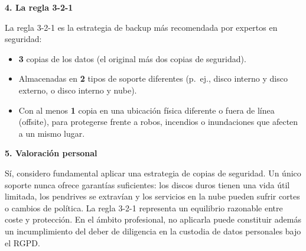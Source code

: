 \begin{solution}
	\medskip

	\textbf{4. La regla 3-2-1}

	La regla 3-2-1 es la estrategia de backup más recomendada por expertos en seguridad:

	\begin{itemize}
		\item \textbf{3} copias de los datos (el original más dos copias de seguridad).
		\item Almacenadas en \textbf{2} tipos de soporte diferentes (p.~ej., disco interno y disco
		      externo, o disco interno y nube).
		\item Con al menos \textbf{1} copia en una ubicación física diferente o fuera de línea
		      (offsite), para protegerse frente a robos, incendios o inundaciones que afecten a un
		      mismo lugar.
	\end{itemize}

	\medskip

	\textbf{5. Valoración personal}

	Sí, considero fundamental aplicar una estrategia de copias de seguridad. Un único soporte
	nunca ofrece garantías suficientes: los discos duros tienen una vida útil limitada, los
	pendrives se extravían y los servicios en la nube pueden sufrir cortes o cambios de política.
	La regla 3-2-1 representa un equilibrio razonable entre coste y protección. En el ámbito
	profesional, no aplicarla puede constituir además un incumplimiento del deber de diligencia
	en la custodia de datos personales bajo el RGPD.

\end{solution}
